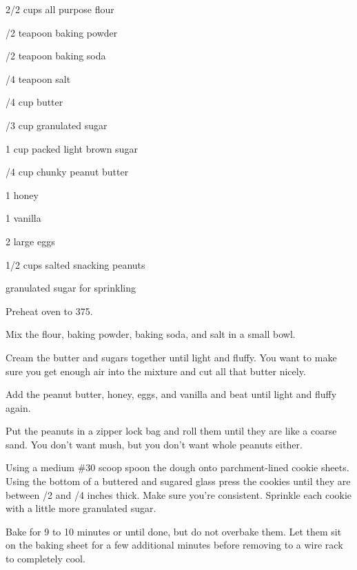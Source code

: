 \begin{IngredientsAndSteps}
    \ListIngredientsAndSteps
    {
        2/2 cups all purpose flour

        /2 teapoon baking powder

        /2 teapoon baking soda

        /4 teapoon salt

        \IngredientsSeparatorClear

        /4 cup butter

        /3 cup granulated sugar

        1 cup packed light brown sugar

        /4 cup chunky peanut butter

        1 \Tbl honey

        1 \tsp vanilla

        2 large eggs

        \IngredientsSeparatorClear

        1/2 cups salted snacking peanuts

        granulated sugar for sprinkling
    }
    {
        Preheat oven to 375\Degrees[F].

        Mix the flour, baking powder, baking soda, and salt in a small bowl.

        Cream the butter and sugars together until light and fluffy. You want to make sure you get
        enough air into the mixture and cut all that butter nicely.

        Add the peanut butter, honey, eggs, and vanilla and beat until light and fluffy again.

        Put the peanuts in a zipper lock bag and roll them until they are like a coarse sand. You
        don't want mush, but you don't want whole peanuts either.

        Using a medium \#30 scoop spoon the dough onto parchment-lined cookie sheets. Using
        the bottom of a buttered and sugared glass press the cookies until they are between /2
        and /4 inches thick. Make sure you're consistent. Sprinkle each cookie with a little
        more granulated sugar.

        Bake for 9 to 10 minutes or until done, but do not overbake them. Let them sit on the baking
        sheet for a few additional minutes before removing to a wire rack to completely cool.
    }
\end{IngredientsAndSteps}

